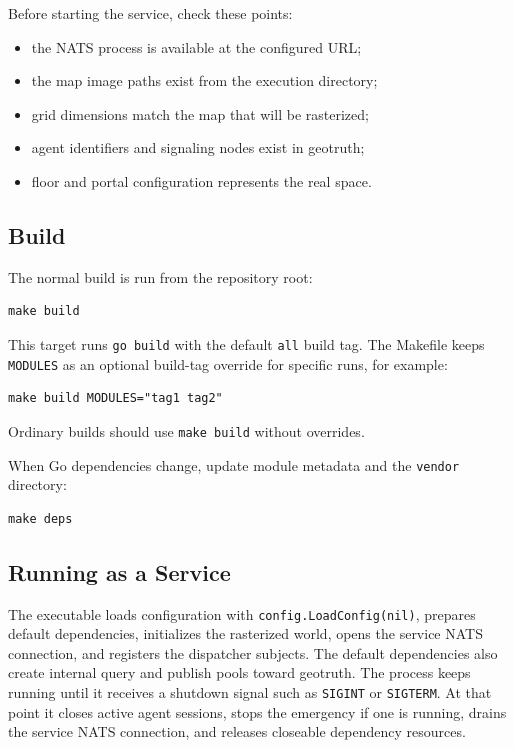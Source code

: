 \documentclass[12pt,a4paper]{report}
\begin{document}
Before starting the service, check these points:

\begin{itemize}
\item the NATS process is available at the configured URL;
\item the map image paths exist from the execution directory;
\item grid dimensions match the map that will be rasterized;
\item agent identifiers and signaling nodes exist in geotruth;
\item floor and portal configuration represents the real space.
\end{itemize}

\subsection{Build}

The normal build is run from the repository root:

\begin{lstlisting}
make build
\end{lstlisting}

This target runs \texttt{go build} with the default \texttt{all} build tag. The
Makefile keeps \texttt{MODULES} as an optional build-tag override for specific
runs, for example:

\begin{lstlisting}
make build MODULES="tag1 tag2"
\end{lstlisting}

Ordinary builds should use \texttt{make build} without overrides.

When Go dependencies change, update module metadata and the \texttt{vendor}
directory:

\begin{lstlisting}
make deps
\end{lstlisting}

\subsection{Running as a Service}

The executable loads configuration with \texttt{config.LoadConfig(nil)}, prepares
default dependencies, initializes the rasterized world, opens the service NATS
connection, and registers the dispatcher subjects. The default dependencies also
create internal query and publish pools toward geotruth. The process keeps
running until it receives a shutdown signal such as \texttt{SIGINT} or
\texttt{SIGTERM}. At that point it closes active agent sessions, stops the
emergency if one is running, drains the service NATS connection, and releases
closeable dependency resources.
\end{document}
